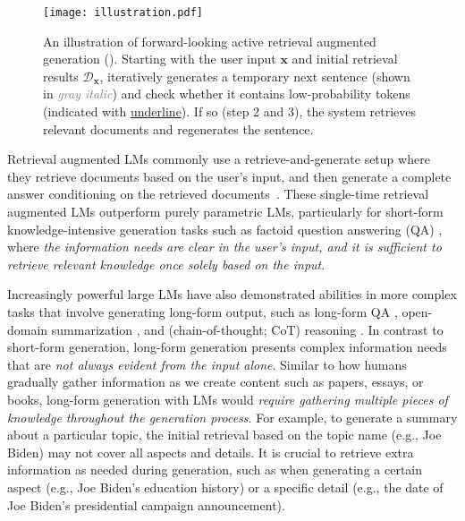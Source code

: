 \begin{figure*}[tb]
\texttt{[image: illustration.pdf]}
\centering
\caption{An illustration of forward-looking active retrieval augmented generation (\ours). Starting with the user input $\bm{x}$ and initial retrieval results $\mathcal{D}_{\bm{x}}$, \ours iteratively generates a temporary next sentence (shown in \textcolor{gray}{\textit{gray italic}}) and check whether it contains low-probability tokens (indicated with \underline{underline}). If so (step 2 and 3), the system retrieves relevant documents and regenerates the sentence.}
\label{fig:illustration}
\end{figure*}

Retrieval augmented LMs commonly use a retrieve-and-generate setup where they retrieve documents based on the user's input, and then generate a complete answer conditioning on the retrieved documents~\cite{drqa-chen-2017,realm-guu-2020,rag-lewis-2020,fid-2021-izacard,emdr2-2021-sachan,yono-2021-lee,reatt-jiang-2022,atlas-izacard-2022,webgpt-nakano-2021,webbrain-qin-2023,lazaridou-internet-2022,replug-shi-2023}.
These single-time retrieval augmented LMs outperform purely parametric LMs, particularly for short-form knowledge-intensive generation tasks such as factoid question answering (QA) \cite{nq-kwiatkowski-2019,joshi-2017-triviaqa}, where \emph{the information needs are clear in the user's input, and it is sufficient to retrieve relevant knowledge once solely based on the input}.

Increasingly powerful large LMs have also demonstrated abilities in more complex tasks that involve generating long-form output, such as long-form QA \cite{eli5-fan-2019,asqa-stelmakh-2022}, open-domain summarization \cite{wikisum-cohen-2021,wikiasp-hayashi-2021,openmds-giorgi-2022}, and (chain-of-thought; CoT) reasoning \cite{cot-wei-2022,2wikimultihopqa-ho-2020,strategyqa-geva-2021,hendrycks-2020-mass}.
In contrast to short-form generation, long-form generation presents complex information needs that are \emph{not always evident from the input alone}. Similar to how humans gradually gather information as we create content such as papers, essays, or books, long-form generation with LMs would \emph{require gathering multiple pieces of knowledge throughout the generation process}.
For example, to generate a summary about a particular topic, the initial retrieval based on the topic name (e.g., Joe Biden) may not cover all aspects and details.
It is crucial to retrieve extra information as needed during generation, such as when generating a certain aspect (e.g., Joe Biden's education history) or a specific detail (e.g., the date of Joe Biden's presidential campaign announcement).

